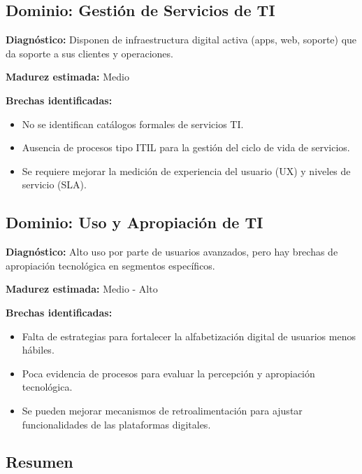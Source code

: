\subsection{Dominio: Gestión de Servicios de TI}

\textbf{Diagnóstico:} Disponen de infraestructura digital activa (apps, web, soporte) que da soporte a sus clientes y operaciones.

\textbf{Madurez estimada:} Medio

\textbf{Brechas identificadas:}
\begin{itemize}
  \item No se identifican catálogos formales de servicios TI.
  \item Ausencia de procesos tipo ITIL para la gestión del ciclo de vida de servicios.
  \item Se requiere mejorar la medición de experiencia del usuario (UX) y niveles de servicio (SLA).
\end{itemize}

\subsection{Dominio: Uso y Apropiación de TI}

\textbf{Diagnóstico:} Alto uso por parte de usuarios avanzados, pero hay brechas de apropiación tecnológica en segmentos específicos.

\textbf{Madurez estimada:} Medio - Alto

\textbf{Brechas identificadas:}
\begin{itemize}
  \item Falta de estrategias para fortalecer la alfabetización digital de usuarios menos hábiles.
  \item Poca evidencia de procesos para evaluar la percepción y apropiación tecnológica.
  \item Se pueden mejorar mecanismos de retroalimentación para ajustar funcionalidades de las plataformas digitales.
\end{itemize}

\subsection*{Resumen}

